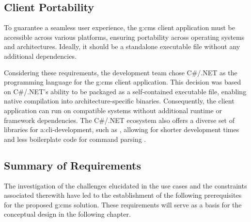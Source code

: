 \subsection{Client Portability}\label{sec:req-client-portability}

To guarantee a seamless user experience, the \gls{g:cms} client application must be accessible across various platforms, ensuring portability across operating systems and architectures. Ideally, it should be a standalone executable file without any additional dependencies.

Considering these requirements, the development team chose C\#/.NET as the programming language for the \gls{g:cms} client application. This decision was based on C\#/.NET's ability to be packaged as a self-contained executable file, enabling native compilation into architecture-specific binaries. Consequently, the client application can run on compatible systems without additional runtime or framework dependencies. The C\#/.NET ecosystem also offers a diverse set of libraries for \gls{a:cli}-development, such as , allowing for shorter development times and less boilerplate code for command parsing \cite{DotnetPublishing} \cite{DotnetPublishingAot}\cite{DotnetSystemCommandline}.

\pagebreak

\subsection{Summary of Requirements}
\label{sec:requirements-summary}

The investigation of the challenges elucidated in the use cases and the constraints associated therewith have led to the establishment of the following prerequisites for the proposed \gls{g:cms} solution. These requirements will serve as a basis for the conceptual design in the following chapter.

